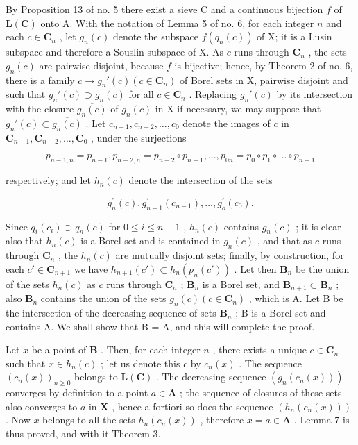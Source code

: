 By Proposition 13 of no. 5 there exist a sieve C and a continuous bijection \(f\) of \(\mathbf{L}(\mathbf{C})\) onto A. With the notation of Lemma 5 of no. 6, for each integer \(n\) and each \(c \in \mathbf{C}_n\) , let \(g_n(c)\) denote the subspace \(f(q_n(c))\) of X; it is a Lusin subspace and therefore a Souslin subspace of X. As \(c\) runs through \(\mathbf{C}_n\) , the sets \(g_n(c)\) are pairwise disjoint, because \(f\) is bijective; hence, by Theorem 2 of no. 6, there is a family \(c \to g_n'(c) (c \in \mathbf{C}_n)\) of Borel sets in X, pairwise disjoint and such that \(g_n'(c) \supset g_n(c)\) for all \(c \in \mathbf{C}_n\) . Replacing \(g_n'(c)\) by its intersection with the closure \(\overline{g_n(c)}\) of \(g_n(c)\) in X if necessary, we may suppose that \(g_n'(c) \subset \overline{g_n(c)}\) . Let \(c_{n-1}, c_{n-2}, \ldots, c_0\) denote the images of \(c\) in \(\mathbf{C}_{n-1}, \mathbf{C}_{n-2}, \ldots, \mathbf{C}_0\) , under the surjections

\[
p _ {n - 1, n} = p _ {n - 1}, p _ {n - 2, n} = p _ {n - 2} \circ p _ {n - 1}, \dots , p _ {0 n} = p _ {0} \circ p _ {1} \circ \dots \circ p _ {n - 1}
\]

respectively; and let \(h_n(c)\) denote the intersection of the sets

\[
g _ {n} ^ {\prime} (c), g _ {n - 1} ^ {\prime} \left(c _ {n - 1}\right), \dots , g _ {o} ^ {\prime} \left(c _ {0}\right).
\]

Since \(q_{i}(c_{i}) \supset q_{n}(c)\) for \(0 \leqslant i \leqslant n - 1\) , \(h_{n}(c)\) contains \(g_{n}(c)\) ; it is clear also that \(h_{n}(c)\) is a Borel set and is contained in \(g_{n}(c)\) , and that as \(c\) runs through \(\mathbf{C}_{n}\) , the \(h_{n}(c)\) are mutually disjoint sets; finally, by construction, for each \(c' \in \mathbf{C}_{n+1}\) we have \(h_{n+1}(c') \subset h_n(p_n(c'))\) . Let then \(\mathbf{B}_n\) be the union of the sets \(h_n(c)\) as \(c\) runs through \(\mathbf{C}_n\) ; \(\mathbf{B}_n\) is a Borel set, and \(\mathbf{B}_{n+1} \subset \mathbf{B}_n\) ; also \(\mathbf{B}_n\) contains the union of the sets \(g_n(c) (c \in \mathbf{C}_n)\) , which is A. Let B be the intersection of the decreasing sequence of sets \(\mathbf{B}_n\) ; B is a Borel set and contains A. We shall show that B = A, and this will complete the proof.

Let \(x\) be a point of \(\mathbf{B}\) . Then, for each integer \(n\) , there exists a unique \(c \in \mathbf{C}_n\) such that \(x \in h_n(c)\) ; let us denote this \(c\) by \(c_n(x)\) . The sequence \((c_n(x))_{n \geqslant 0}\) belongs to \(\mathbf{L}(\mathbf{C})\) . The decreasing sequence \((g_n(c_n(x)))\) converges by definition to a point \(a \in \mathbf{A}\) ; the sequence of closures of these sets also converges to \(a\) in \(\mathbf{X}\) , hence a fortiori so does the sequence \((h_n(c_n(x)))\) . Now \(x\) belongs to all the sets \(h_n(c_n(x))\) , therefore \(x = a \in \mathbf{A}\) . Lemma 7 is thus proved, and with it Theorem 3.

